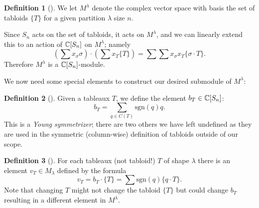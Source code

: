 \documentclass[12pt,twoside]{reedthesis}
\theoremstyle{plain}   %
\theoremstyle{definition}
\newtheorem{defn}{Definition}[section]
\theoremstyle{remark}
\numberwithin{equation}{section}
\def\sgn{\mathrm{sgn}}
\begin{document}
   \begin{defn}[{\cite[Pg. 86]{fulton}}]
     We let $M^\lambda$ denote the complex vector space with basis the set of tabloids $\{T\}$ for a given partition $\lambda$ size $n$.\par
     Since $S_n$ acts on the set of tabloids, it acts on $M^\lambda$, and we can linearly extend this to an action of $\mathbb{C}[S_n]$ on $M^\lambda$;
     namely
     \[ (\sum x_\sigma \sigma) \cdot (\sum x_T \{T\}) = \sum \sum x_\sigma x_T \{ \sigma \cdot T \}.\]
     Therefore $M^\lambda$ is a $\mathbb{C}[S_n]$-module. 
   \end{defn}
   We now need some special elements to construct our desired submodule of $M^\lambda$:
   \begin{defn}[{\cite[Pg. 86]{fulton}}]
     Given a tableaux $T$, we define the element $ b_T \in \mathbb{C}[S_n]$:
     \[b_T = \sum_{q \in C(T)} \sgn(q)q.\]
     This is a \emph{Young symmetrizer}; there are two others we have left undefined as they are used in the symmetric (column-wise)
     definition of tabloids outside of our scope.
   \end{defn}

   \begin{defn}[{\cite[Pg. 86]{fulton}}]
     For each tableaux (not tabloid!) $T$ of shape $\lambda$ there is an element $v_T \in M_\lambda$
     defined by the formula
     \[v_T = b_T \cdot \{T\} = \sum \sgn(q) \{q \cdot T\}.\]
     Note that changing $T$ might not change the tabloid $\{T\}$ but could change $b_T$ resulting in a different element in $M^\lambda$.
   \end{defn}
\end{document}
